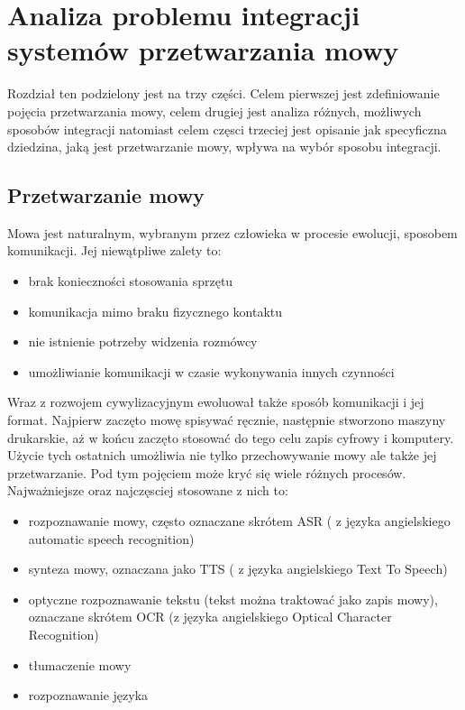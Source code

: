 
\chapter{Analiza problemu integracji systemów przetwarzania mowy} %



\ifpdf
    \graphicspath{{2/figures/PNG/}{2/figures/PDF/}{2/figures/}}
\else
    \graphicspath{{2/figures/EPS/}{2/figures/}}
\fi


Rozdział ten podzielony jest na trzy części. Celem pierwszej jest zdefiniowanie pojęcia przetwarzania mowy, celem drugiej jest analiza różnych, możliwych sposobów integracji natomiast celem częsci trzeciej jest opisanie jak specyficzna dziedzina, jaką jest przetwarzanie mowy, wpływa na wybór sposobu integracji.

\section{Przetwarzanie mowy}
Mowa jest naturalnym, wybranym przez człowieka w procesie ewolucji, sposobem komunikacji. Jej niewątpliwe zalety to:
\begin{itemize}
	\item brak konieczności stosowania sprzętu
	\item komunikacja mimo braku fizycznego kontaktu
	\item nie istnienie potrzeby widzenia rozmówcy
	\item umożliwianie komunikacji w czasie wykonywania innych czynności
\end{itemize}
Wraz z rozwojem cywylizacyjnym ewoluował także sposób komunikacji i jej format. Najpierw zaczęto mowę spisywać ręcznie, następnie stworzono maszyny drukarskie, aż w końcu zaczęto stosować do tego celu zapis cyfrowy i komputery. Użycie tych ostatnich umożliwia nie tylko przechowywanie mowy ale także jej przetwarzanie. Pod tym pojęciem może kryć się wiele różnych procesów. Najważniejsze oraz najczęsciej stosowane z nich to:
\begin{itemize}
	\item rozpoznawanie mowy, często oznaczane skrótem ASR ( z języka angielskiego automatic speech recognition)
	\item synteza mowy, oznaczana jako TTS ( z języka angielskiego Text To Speech)
	\item optyczne rozpoznawanie tekstu (tekst można traktować jako zapis mowy), oznaczane skrótem OCR (z języka angielskiego Optical Character Recognition)
	\item tłumaczenie mowy
	\item rozpoznawanie języka
\end{itemize} 
